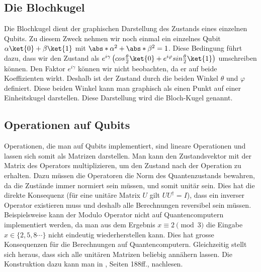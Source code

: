 \subsection{Die Blochkugel}
Die Blochkugel dient der graphischen Darstellung des Zustands eines einzelnen Qubits. Zu diesem Zweck nehmen wir noch einmal ein einzelnes Qubit $\alpha\ket{0} + \beta\ket{1}$ mit $\abs*{\alpha}^2 + \abs*{\beta}^2 = 1$. Diese Bedingung führt dazu, dass wir den Zustand als $e^{i\gamma}\left(cos\frac{\theta}{2}\ket{0} + e^{i\varphi}sin\frac{\theta}{2}\ket{1}\right)$ umschreiben können. Den Faktor $e^{i\gamma}$ können wir nicht beobachten, da er auf beide Koeffizienten wirkt. Deshalb ist der Zustand durch die beiden Winkel $\theta$ und $\varphi$ definiert. Diese beiden Winkel kann man graphisch als einen Punkt auf einer Einheitskugel darstellen. Diese Darstellung wird die Bloch-Kugel genannt.


\subsection{Operationen auf Qubits}
Operationen, die man auf Qubits implementiert, sind lineare Operationen und lassen sich somit als Matrizen darstellen. Man kann den Zustandsvektor mit der Matrix des Operators multiplizieren, um den Zustand nach der Operation zu erhalten. Dazu müssen die Operatoren die Norm des Quantenzustands bewahren, da die Zustände immer normiert sein müssen, und somit unitär sein. Dies hat die direkte Konsequenz (für eine unitäre Matrix $U$ gilt $UU^{\dagger} = I$), dass ein inverser Operator existieren muss und deshalb alle Berechnungen reversibel sein müssen. Beispielsweise kann der Modulo Operator nicht auf Quantencomputern implementiert werden, da man aus dem Ergebnis $x \equiv 2 \pmod{3}$ die Eingabe $x \in \{2, 5, 8\cdots\}$ nicht eindeutig wiederherstellen kann. Dies hat grosse Konsequenzen für die Berechnungen auf Quantencomputern. Gleichzeitig stellt sich heraus, dass sich alle unitären Matrizen beliebig annähern lassen. Die Konstruktion dazu kann man in \cite{QC}, Seiten 188ff., nachlesen.

